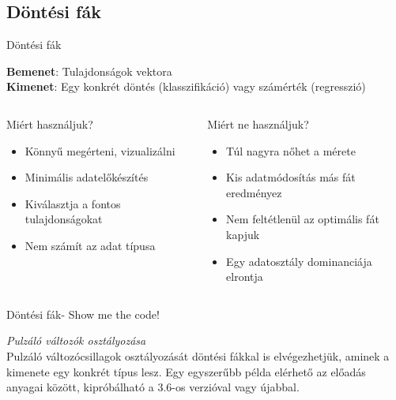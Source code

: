 \subsection{Döntési fák}
\begin{frame}{Döntési fák}
    
    {\bf Bemenet}: Tulajdonságok vektora \\
    {\bf Kimenet}: Egy konkrét döntés (klasszifikáció) vagy számérték (regresszió)
    \begin{columns}
        \begin{column}{0.45\textwidth}
            \begin{block}{Miért használjuk?}
                \begin{itemize}
                    \item Könnyű megérteni, vizualizálni
                    \item Minimális adatelőkészítés
                    \item Kiválasztja a fontos tulajdonságokat
                    \item Nem számít az adat típusa
                \end{itemize}
            \end{block}
        \end{column}
        \begin{column}{0.45\textwidth}
            \begin{block}{Miért ne használjuk?}
                \begin{itemize}
                    \item Túl nagyra nőhet a mérete
                    \item Kis adatmódosítás más fát eredményez
                    \item Nem feltétlenül az optimális fát kapjuk
                    \item Egy adatosztály dominanciája elrontja
                \end{itemize}
            \end{block}
        \end{column}
    \end{columns}
\end{frame}

\begin{frame}{Döntési fák- Show me the code!}

    \Huge{{\it Pulzáló változók osztályozása}} \\
    \vspace{0.5cm} 
    \large{Pulzáló változócsillagok osztályozását döntési fákkal is elvégezhetjük, aminek a kimenete egy konkrét típus lesz. Egy egyszerűbb példa elérhető az előadás anyagai között, kipróbálható a 3.6-os verzióval vagy újabbal.}
    
\end{frame}

